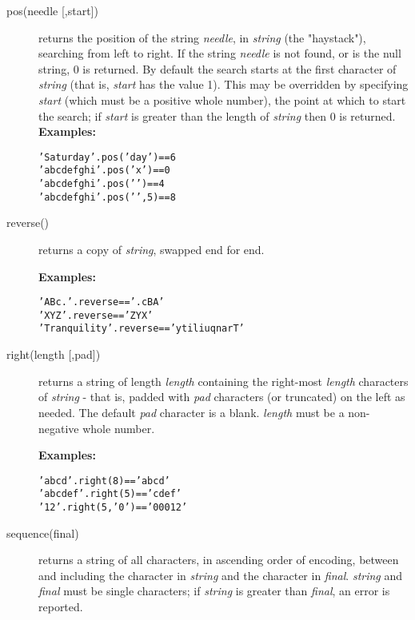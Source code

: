 \begin{description}
\item[pos(needle [,start{]})]\label{refpos}
returns the position of the string \emph{needle}, in
\emph{string} (the "haystack"), searching from left to right.
If the string \emph{needle} is not found, or is the null string,
0 is returned.
By default the search starts at the first character of
\emph{string} (that is, \emph{start} has the value 1).
This may be overridden by specifying \emph{start} (which must be a
positive whole number), the point at which to start the search; if
\emph{start} is greater than the length of \emph{string} then 0
is returned.
 \textbf{Examples:}
\begin{alltt}
'Saturday'.pos('day')    == 6
'abc def ghi'.pos('x')   == 0
'abc def ghi'.pos(' ')   == 4
'abc def ghi'.pos(' ',5) == 8
\end{alltt}

\item[reverse()]\label{refreverse}
returns a copy of \emph{string}, swapped end for end.
 
\textbf{Examples:}
\begin{alltt}
'ABc.'.reverse        == '.cBA'
'XYZ '.reverse        == ' ZYX'
'Tranquility'.reverse == 'ytiliuqnarT'
\end{alltt}
\item[right(length [,pad{]})]\label{refright}

returns a string of length \emph{length} containing the
right-most \emph{length} characters of \emph{string} -
that is, padded with \emph{pad} characters (or truncated) on the
left as needed.  The default \emph{pad} character is a blank.
\emph{length} must be a non-negative whole number.
 
\textbf{Examples:}
\begin{alltt}
'abc  d'.right(8)  == '  abc  d'
'abc def'.right(5) == 'c def'
'12'.right(5,'0')  == '00012'
\end{alltt}

\item[sequence(final)]\label{refsequen}
 returns a string of all characters, in ascending order of encoding,
between and including the character in \emph{string} and the
character in \emph{final}.
\emph{string} and \emph{final} must be single characters;
if \emph{string} is greater than \emph{final}, an error is
reported.
 

\end{description}
